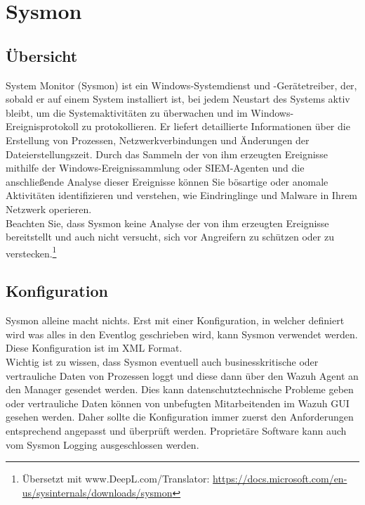 \chapter{Sysmon}
\section{Übersicht}
System Monitor (Sysmon) ist ein Windows-Systemdienst und -Gerätetreiber, der, sobald er auf einem System installiert ist, bei jedem Neustart des Systems aktiv bleibt, um die Systemaktivitäten zu überwachen und im Windows-Ereignisprotokoll zu protokollieren. Er liefert detaillierte Informationen über die Erstellung von Prozessen, Netzwerkverbindungen und Änderungen der Dateierstellungszeit. Durch das Sammeln der von ihm erzeugten Ereignisse mithilfe der Windows-Ereignissammlung oder SIEM-Agenten und die anschließende Analyse dieser Ereignisse können Sie bösartige oder anomale Aktivitäten identifizieren und verstehen, wie Eindringlinge und Malware in Ihrem Netzwerk operieren.\\

Beachten Sie, dass Sysmon keine Analyse der von ihm erzeugten Ereignisse bereitstellt und auch nicht versucht, sich vor Angreifern zu schützen oder zu verstecken.\footnote{Übersetzt mit www.DeepL.com/Translator: \href{https://docs.microsoft.com/en-us/sysinternals/downloads/sysmon}{https://docs.microsoft.com/en-us/sysinternals/downloads/sysmon}}

\section{Konfiguration}
Sysmon alleine macht nichts. 
Erst mit einer Konfiguration, in welcher definiert wird was alles in den Eventlog geschrieben wird, kann Sysmon verwendet werden.
Diese Konfiguration ist im XML Format. \\

Wichtig ist zu wissen, dass Sysmon eventuell auch businesskritische oder vertrauliche Daten von Prozessen loggt und diese dann über den Wazuh Agent an den Manager gesendet werden.
Dies kann datenschutztechnische Probleme geben oder vertrauliche Daten können von unbefugten Mitarbeitenden im Wazuh GUI gesehen werden.
Daher sollte die Konfiguration immer zuerst den Anforderungen entsprechend angepasst und überprüft werden.
Proprietäre Software kann auch vom Sysmon Logging ausgeschlossen werden.

